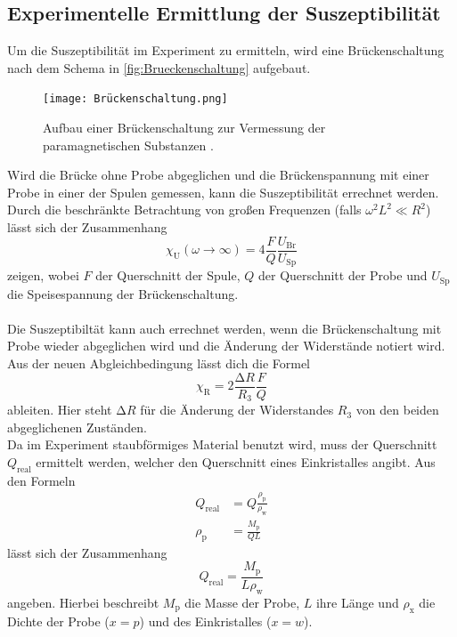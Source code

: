 \subsection{Experimentelle Ermittlung der Suszeptibilität}
Um die Suszeptibilität im Experiment zu ermitteln, wird eine Brückenschaltung nach dem Schema in \autoref{fig:Brueckenschaltung} aufgebaut.
\begin{figure}
    \centering
    \texttt{[image: Brückenschaltung.png]}
    \caption{Aufbau einer Brückenschaltung zur Vermessung der paramagnetischen Substanzen \cite{anleitung}.}
    \label{fig:Brueckenschaltung}
\end{figure}
Wird die Brücke ohne Probe abgeglichen und die Brückenspannung mit einer Probe in einer der Spulen gemessen, kann die Suszeptibilität errechnet werden.
Durch die beschränkte Betrachtung von großen Frequenzen (falls $\omega^2L^2 \ll R^2$) lässt sich der Zusammenhang
\begin{equation}\label{eqn:chi_u}
    \chi_{\text{U}}(\omega\to\infty) = 4 \frac{F}{Q}\frac{U_{\text{Br}}}{U_{\text{Sp}}}
\end{equation}
zeigen, wobei $F$ der Querschnitt der Spule, $Q$ der Querschnitt der Probe und $U_{\text{Sp}}$ die Speisespannung der Brückenschaltung.\\
\\
Die Suszeptibiltät kann auch errechnet werden, wenn die Brückenschaltung mit Probe wieder abgeglichen wird und die Änderung der Widerstände notiert wird.
Aus der neuen Abgleichbedingung lässt dich die Formel 
\begin{equation}\label{eqn:chi_r}
    \chi_{\text{R}} = 2 \frac{\increment R}{R_3} \frac{F}{Q}
\end{equation}
ableiten.
Hier steht $\increment R$ für die Änderung der Widerstandes $R_3$ von den beiden abgeglichenen Zuständen.\\
Da im Experiment staubförmiges Material benutzt wird, muss der Querschnitt $Q_{\text{real}}$ ermittelt werden, welcher den Querschnitt eines Einkristalles angibt.
Aus den Formeln 
\begin{align*}
    Q_{\text{real}} &= Q \frac{\rho_{\text{p}}}{\rho_{\text{w}}}\\
    \rho_{\text{p}} &= \frac{M_{\text{p}}}{QL}
\end{align*}
lässt sich der Zusammenhang 
\begin{equation}\label{eqn:qreal}
    Q_{\text{real}} = \frac{M_{\text{p}}}{L \rho_{\text{w}}}
\end{equation}
angeben.
Hierbei beschreibt $M_{\text{p}}$ die Masse der Probe, $L$ ihre Länge und $\rho_{\text{x}}$ die Dichte der Probe ($x=p$) und des Einkristalles ($x=w$).

